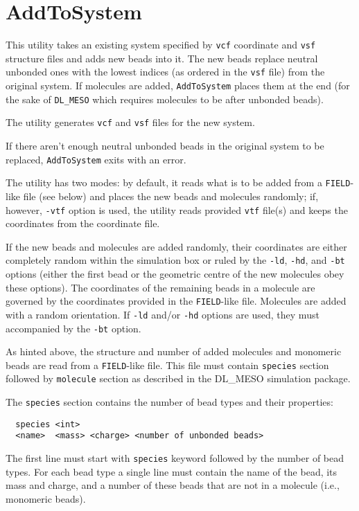 \section{AddToSystem} \label{sec:AddToSystem}

This utility takes an existing system specified by \texttt{vcf} coordinate
and \texttt{vsf} structure files and adds new beads into it. The new beads
replace neutral unbonded ones with the lowest indices (as ordered in the
\texttt{vsf} file) from the original system. If molecules are added,
\texttt{AddToSystem} places them at the end (for the sake of
\texttt{DL\_MESO} which requires molecules to be after unbonded beads).

The utility generates \texttt{vcf} and \texttt{vsf} files for the new
system.

If there aren't enough neutral unbonded beads in the original system to be
replaced, \texttt{AddToSystem} exits with an error.

The utility has two modes: by default, it reads what is to be added from a
\texttt{FIELD}-like file (see below) and places the new beads and molecules
randomly; if, however, \texttt{-vtf} option is used, the utility reads
provided \texttt{vtf} file(s) and keeps the coordinates from the coordinate
file.

If the new beads and molecules are added randomly, their coordinates are
either completely random within the simulation box or ruled by the
\texttt{-ld}, \texttt{-hd}, and \texttt{-bt} options (either the first bead
or the geometric centre of the new molecules obey these options). The
coordinates of the remaining beads in a molecule are governed by the
coordinates provided in the \texttt{FIELD}-like file. Molecules are added
with a random orientation.  If \texttt{-ld} and/or \texttt{-hd} options are
used, they must accompanied by the \texttt{-bt} option.

As hinted above, the structure and number of added molecules and monomeric
beads are read from a \texttt{FIELD}-like file. This file must contain
\texttt{species} section followed by \texttt{molecule} section as described
in the DL\_MESO simulation package.

The \texttt{species} section contains the number of bead types and their
properties:
\begin{verbatim}
  species <int>
  <name>  <mass> <charge> <number of unbonded beads>
\end{verbatim}
The first line must start with \texttt{species} keyword followed by the
number of bead types. For each bead type a single line must contain the name of
the bead, its mass and charge, and a number of these beads that are not
in a molecule (i.e., monomeric beads).

